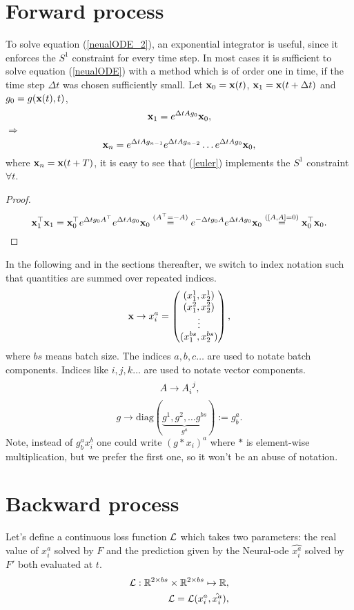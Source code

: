 \documentclass[12pt,a4paper]{article}
\begin{document}
\section{Forward process}
To solve equation (\ref{neualODE_2}), an exponential integrator is useful, since it enforces the $S^1$ constraint for every time step. In most cases it is sufficient to solve equation (\ref{neualODE}) with a method which is of order one in time, if the time step $\Delta t$ was chosen sufficiently small. 
Let $\textbf{x}_0 = \textbf{x}(t)$, $\textbf{x}_1 = \textbf{x}(t+\Delta t) $ and $g_0 = g(\textbf{x}(t), t)$,
\begin{equation}
\label{euler}
\textbf{x}_1 = e^{\Delta t Ag_0}\textbf{x}_0,
\end{equation}
$\Rightarrow$ 
\begin{equation}
\label{forward}
\textbf{x}_n = e^{\Delta t Ag_{n-1}}e^{\Delta t Ag_{n-2}}\ldots e^{\Delta t Ag_{0}}\textbf{x}_0,
\end{equation}
where $\textbf{x}_n = \textbf{x}(t+T)$,
it is easy to see that (\ref{euler}) implements the $S^1$ constraint $\forall t$.
\begin{proof}
$$
\textbf{x}_1^\top \textbf{x}_1 = \textbf{x}_0^\top e^{\Delta t g_0 A^\top}e^{\Delta t Ag_0}\textbf{x}_0 \stackrel{(A^\top = -A)}{=} e^{-\Delta t g_0 A}e^{\Delta t Ag_0}\textbf{x}_0 \stackrel{([A,A] =0)}{=} \textbf{x}_0^\top \textbf{x}_0.
$$
\end{proof}

In the following and in the sections thereafter, we switch to index notation such that quantities are summed over repeated indices.
$$
\textbf{x} \rightarrow x^a_i = \begin{pmatrix}
(x^1_1, x^1_2)  \\
(x^2_1, x^2_2) \\
\vdots  \\
(x^{bs}_1,x^{bs}_2)
\end{pmatrix}
,$$where $bs$ means batch size.
The indices $a,b,c \ldots$ are used to notate batch components. Indices like $i,j,k \ldots$ are used to notate vector components.
$$
A \rightarrow A_i^{\ j},
$$
$$
g \rightarrow \text{diag}(\underbrace{g^1,g^2,\ldots g^{bs}}_ {g^a}) := g^a_b.
$$
Note, instead of $g^a_b x_i^b$ one could write $(g \ast x_i)^a $ where $\ast$ is element-wise multiplication, but we prefer the first one, so it won't be an abuse of notation.


\section{Backward process}



Let's define a continuous loss function $\mathcal{L}$ which takes two parameters: the real value of $x^a_i$ solved by $F$ and the prediction given by the Neural-ode $\hat{x^a_i}$ solved by $F'$ both evaluated at $t$.
\begin{equation}
\label{loss_function}
\begin{split}
\mathcal{L} : \mathbb{R}^{2\times bs}\times \mathbb{R}^{2\times bs} \mapsto \mathbb{R}, \\
\mathcal{L} = \mathcal{L}(x^a_i,\hat{x^a_i}),
\end{split}
\end{equation}
\end{document}
